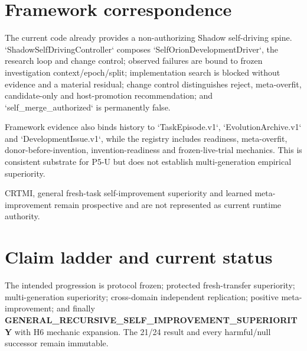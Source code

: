 \documentclass[11pt]{article}
\begin{document}
\section{Framework correspondence}
The current code already provides a non-authorizing Shadow self-driving spine. `ShadowSelfDrivingController` composes `SelfOrionDevelopmentDriver`, the research loop and change control; observed failures are bound to frozen investigation context/epoch/split; implementation search is blocked without evidence and a material residual; change control distinguishes reject, meta-overfit, candidate-only and host-promotion recommendation; and `self_merge_authorized` is permanently false.

Framework evidence also binds history to `TaskEpisode.v1`, `EvolutionArchive.v1` and `DevelopmentIssue.v1`, while the registry includes readiness, meta-overfit, donor-before-invention, invention-readiness and frozen-live-trial mechanics. This is consistent substrate for P5-U but does not establish multi-generation empirical superiority.

CRTMI, general fresh-task self-improvement superiority and learned meta-improvement remain prospective and are not represented as current runtime authority.

\section{Claim ladder and current status}
The intended progression is protocol frozen; protected fresh-transfer superiority; multi-generation superiority; cross-domain independent replication; positive meta-improvement; and finally \textbf{GENERAL\_RECURSIVE\_SELF\_IMPROVEMENT\_SUPERIORITY} with H6 mechanic expansion. The 21/24 result and every harmful/null successor remain immutable.
\end{document}
